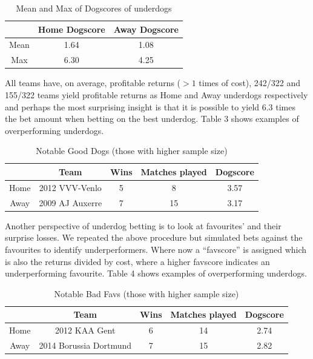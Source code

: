 \documentclass[12pt, a4paper]{article}
\begin{document}
\begin{table}[!ht]
    \centering
    \begin{tabular}{|c|c|c|}
    \hline & Home Dogscore & Away Dogscore \\
    \hline Mean & 1.64 & 1.08 \\
    \hline Max & 6.30 & 4.25 \\
    \hline

    \end{tabular}
    \caption{Mean and Max of Dogscores of underdogs}
    \label{tab:my_label}
\end{table}

All teams have, on average, profitable returns ($>1$ times of cost), 242/322 and 155/322 teams yield profitable returns as Home and Away underdogs respectively and perhaps the most surprising insight is that it is possible to yield 6.3 times the bet amount when betting on the best underdog. Table 3 shows examples of overperforming underdogs.

\begin{table}[!ht]
    \centering
    \begin{tabular}{|c|c|c|c|c|}
    \hline & Team & Wins & Matches played & Dogscore \\
    \hline Home & 2012 VVV-Venlo & 5 & 8 & 3.57 \\
    \hline Away & 2009 AJ Auxerre & 7 & 15 & 3.17 \\
    \hline

    \end{tabular}
    \caption{Notable Good Dogs (those with higher sample size)}
    \label{tab:my_label}
\end{table}

Another perspective of underdog betting is to look at favourites’ and their surprise losses. We repeated the above procedure but simulated bets against the favourites to identify underperformers. Where now a “favscore” is assigned which is also the returns divided by cost, where a higher favscore indicates an underperforming favourite. Table 4 shows examples of overperforming underdogs.

\begin{table}[!ht]
    \centering
    \begin{tabular}{|c|c|c|c|c|}
    \hline & Team & Wins & Matches played & Dogscore \\
    \hline Home & 2012 KAA Gent & 6 & 14 & 2.74 \\
    \hline Away & 2014 Borussia Dortmund & 7 & 15 & 2.82 \\
    \hline

    \end{tabular}
    \caption{Notable Bad Favs (those with higher sample size)}
    \label{tab:my_label}
\end{table}
\end{document}
